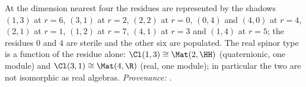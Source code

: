 At the dimension nearest four the residues are represented by the shadows $(1,3)$ at $r = 6$, $(3,1)$ at $r = 2$, $(2,2)$ at $r = 0$, $(0,4)$ and $(4,0)$ at $r = 4$, $(2,1)$ at $r = 1$, $(1,2)$ at $r = 7$, $(4,1)$ at $r = 3$ and $(1,4)$ at $r = 5$; the residues $0$ and $4$ are sterile and the other six are populated. The real spinor type is a function of the residue alone: $\Cl(1,3) \cong \Mat(2,\HH)$ (quaternionic, one module) and $\Cl(3,1) \cong \Mat(4,\R)$ (real, one module); in particular the two are not isomorphic as real algebras. \emph{Provenance:} \cite[Prop.~3.1, Thm.~3.4]{ButlerT14}.
